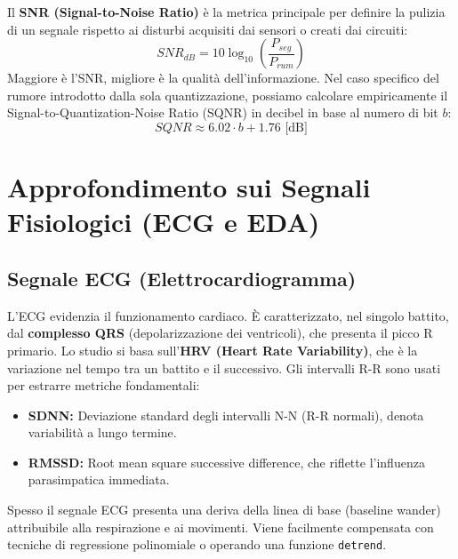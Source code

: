 Il \textbf{SNR (Signal-to-Noise Ratio)} è la metrica principale per definire la pulizia di un segnale rispetto ai disturbi acquisiti dai sensori o creati dai circuiti:
\begin{equation}
    SNR_{dB} = 10 \log_{10} \left( \frac{P_{seg}}{P_{rum}} \right)
\end{equation}
Maggiore è l'SNR, migliore è la qualità dell'informazione.
Nel caso specifico del rumore introdotto dalla sola quantizzazione, possiamo calcolare empiricamente il Signal-to-Quantization-Noise Ratio (SQNR) in decibel in base al numero di bit $b$:
\begin{equation}
    SQNR \approx 6.02 \cdot b + 1.76 \text{ [dB]}
\end{equation}

\section{Approfondimento sui Segnali Fisiologici (ECG e EDA)}
\subsection{Segnale ECG (Elettrocardiogramma)}
L'ECG evidenzia il funzionamento cardiaco.
È caratterizzato, nel singolo battito, dal \textbf{complesso QRS} (depolarizzazione dei ventricoli), che presenta il picco R primario.
Lo studio si basa sull'\textbf{HRV (Heart Rate Variability)}, che è la variazione nel tempo tra un battito e il successivo.
Gli intervalli R-R sono usati per estrarre metriche fondamentali:
\begin{itemize}
    \item \textbf{SDNN:} Deviazione standard degli intervalli N-N (R-R normali), denota variabilità a lungo termine.
    \item \textbf{RMSSD:} Root mean square successive difference, che riflette l'influenza parasimpatica immediata.
\end{itemize}
Spesso il segnale ECG presenta una deriva della linea di base (baseline wander) attribuibile alla respirazione e ai movimenti.
Viene facilmente compensata con tecniche di regressione polinomiale o operando una funzione \texttt{detrend}.

